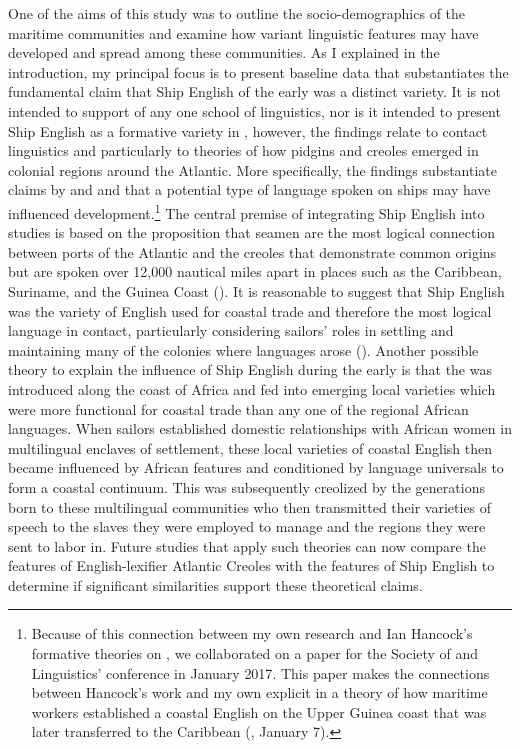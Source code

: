 One of the aims of this study was to outline the socio-demographics of the maritime communities and examine how variant linguistic features may have developed and spread among these communities. As I explained in the introduction, my principal focus is to present baseline data that substantiates the fundamental claim that Ship English of the early  was a distinct variety. It is not intended to support of any one school of  linguistics, nor is it intended to present Ship English as a formative variety in , however, the findings relate to contact linguistics and particularly to theories of how pidgins and creoles emerged in colonial regions around the Atlantic. More specifically, the findings substantiate claims by \citet{Reinecke1938} and  \citealt{Hancock1972} \citealt{Hancock1976} \citealt{Hancock1986} and \citealt{Hancock1988} that a potential type of language spoken on ships may have influenced  development.\footnote{Because of this connection between my own research and Ian Hancock’s formative theories on , we collaborated on a paper for the Society of  and  Linguistics’ conference in January {2017}. This paper makes the connections between Hancock’s work and my own explicit in a theory of how maritime workers established a coastal English on the Upper Guinea coast that was later transferred to the Caribbean (\citealt{DelgadoHancock2017}, January 7).} The central premise of integrating Ship English into  studies is based on the proposition that seamen are the most logical connection between ports of the Atlantic and the creoles that demonstrate common origins but are spoken over 12,000 nautical miles apart in places such as the Caribbean, Suriname, and the Guinea Coast (\citealt{Hancock1976,FaraclasEtAl2012}). It is reasonable to suggest that Ship English was the variety of English used for coastal trade and therefore the most logical language in contact, particularly considering sailors’ roles in settling and maintaining many of the colonies where  languages arose (\citealt{BaileyRoss1988,Holm1988}). Another possible theory to explain the influence of Ship English during the early  is that the  was introduced along the coast of Africa and fed into emerging local varieties which were more functional for coastal trade than any one of the regional African languages. When sailors established domestic relationships with African women in multilingual enclaves of settlement, these local varieties of coastal English then became influenced by African features and conditioned by language universals to form a coastal  continuum. This  was subsequently creolized by the generations born to these multilingual communities who then transmitted their varieties of speech to the slaves they were employed to manage and the regions they were sent to labor in. Future studies that apply such theories can now compare the features of English-lexifier Atlantic Creoles with the features of Ship English to determine if significant similarities support these theoretical claims. 


